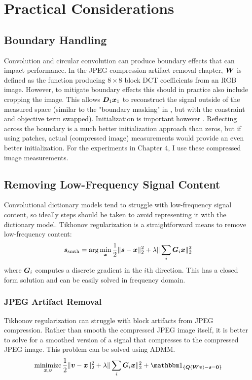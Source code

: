 \chapter{Practical Considerations}
\section{Boundary Handling}
Convolution and circular convolution can produce boundary effects that can impact performance. In the JPEG compression artifact removal chapter, $\bm{W}$ is defined as the function producing $8 \times 8$ block DCT coefficients from an RGB image. However, to mitigate boundary effects this should in practice also include cropping the image. This allows $\bm{D}_1\bm{x}_1$ to reconstruct the signal outside of the measured space (similar to the "boundary masking" in \cite{wohlberg2016boundary}, but with the constraint and objective term swapped). Initialization is important however \cite{DBLP:journals/corr/WohlbergR17}. Reflecting across the boundary is a much better initialization approach than zeros, but if using patches, actual (compressed image) measurements would provide an even better initialization. For the experiments in Chapter $4$, I use these compressed image measurements.
\section{Removing Low-Frequency Signal Content}
Convolutional dictionary models tend to struggle with low-frequency signal content, so ideally steps should be taken to avoid representing it with the dictionary model. Tikhonov regularization is a straightforward means to remove low-frequency content:
\begin{equation}
\bm{s}_{\text{smth}} = \arg\min_{\bm{x}} \frac{1}{2}\|\bm{s} - \bm{x}\|_2^2 + \lambda\|\sum_i \bm{G}_i\bm{x}\|_2^2
\end{equation}
where $\bm{G}_i$ computes a discrete gradient in the $i$th direction. This has a closed form solution and can be easily solved in frequency domain.
\subsection{JPEG Artifact Removal}
Tikhonov regularization can struggle with block artifacts from JPEG compression. Rather than smooth the compressed JPEG image itself, it is better to solve for a smoothed version of a signal that compresses to the compressed JPEG image. This problem can be solved using ADMM.
\begin{equation}
\minimize_{\vx,\vv} \frac{1}{2}\|\vv - \vx\|_2^2 + \lambda\|\sum_i \mG_i\vx\|_2^2 + \indicator_{\{\mQ(\mW\vv) - \vs = \vzero\}}
\end{equation}

